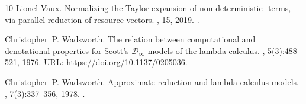 \documentclass[10pt,a4paper]{amsart}
\theoremstyle{definition}
\begin{document}
\begin{thebibliography}{10}
Lionel Vaux.
\newblock Normalizing the {T}aylor expansion of non-deterministic \lam-terms,
  via parallel reduction of resource vectors.
, 15, 2019.
\newblock \href {https://doi.org/10.23638/LMCS-15(3:9)2019}
  {}.

Christopher~P. Wadsworth.
\newblock The relation between computational and denotational properties for
  {S}cott's $\mathcal{D}_\infty$-models of the lambda-calculus.
, 5(3):488--521, 1976.
\newblock URL: \url{https://doi.org/10.1137/0205036}.

Christopher~P. Wadsworth.
\newblock Approximate reduction and lambda calculus models.
, 7(3):337--356, 1978.
\newblock \href {https://doi.org/10.1137/0207028} {}.

\end{thebibliography}
\end{document}
